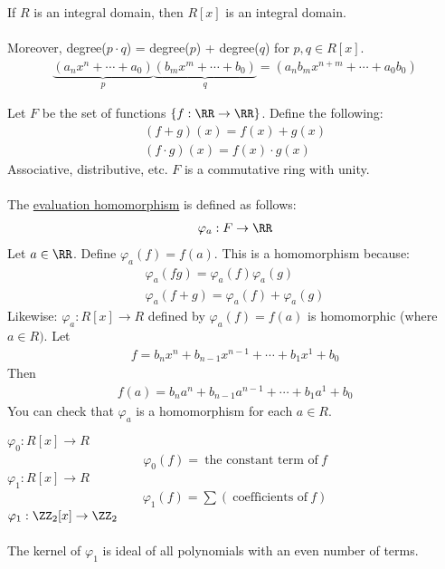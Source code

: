 \documentclass[class=scrartcl, crop=false]{standalone}
\begin{document}
\begin{proposition}
  If $R$ is an integral domain, then $R[x]$ is an integral domain.
  \\\\
  Moreover, degree($p \cdot q$) = degree($p$) + degree($q$) for $p, q \in R[x]$.
  \begin{gather*}
    \underbrace{(a_nx^n + \cdots + a_0)}_{p}\underbrace{(b_mx^m + \cdots + b_0)}_{q} = (a_nb_mx^{n + m} + \cdots + a_0b_0)
  \end{gather*} 
\end{proposition} 

\begin{definition}
  Let $F$ be the set of functions $\{f: \RR \to \RR\}$. Define the following:
  \begin{gather*}
    (f + g)(x) = f(x) + g(x) \\
    (f \cdot g)(x) = f(x) \cdot g(x)
  \end{gather*} 
  Associative, distributive, etc. $F$ is a commutative ring with unity.
  \\\\
  The \ul{evaluation homomorphism} is defined as follows:
  \begin{gather*}
    \varphi_{a}: F \to \RR
  \end{gather*} 
  Let $a \in \RR$. Define $\varphi_{a}(f) = f(a)$. This is a homomorphism because:
  \begin{gather*}
    \varphi_a(fg) = \varphi_a(f)\varphi_a(g) \\
    \varphi_a(f + g) = \varphi_a(f) + \varphi_a(g)
  \end{gather*} 
  Likewise: $\varphi_a:R[x] \to R$ defined by $\varphi_a(f) = f(a)$ is homomorphic (where $a \in R)$. Let 
  \begin{gather*}
    f = b_n x^n + b_{n- 1}x^{n - 1} + \cdots + b_1x^1 + b_0
  \end{gather*} 
  Then 
  \begin{gather*}
    f(a) = b_n a^n + b_{n- 1}a^{n - 1} + \cdots + b_1a^1 + b_0
  \end{gather*} 
  You can check that $\varphi_a$ is a homomorphism for each $a \in R$.
  \begin{example}
    \begin{enumerate}
      \ii[]
      \ii
      $\varphi_0: R[x] \to R$
      \begin{gather*}
        \varphi_0(f) = \ \text{the constant term of} \ f
      \end{gather*} 
      \ii
      $\varphi_1:R[x] \to R$
      \begin{gather*}
        \varphi_1(f) = \sum ( \ \text{coefficients of} \ f)
      \end{gather*} 
      \ii
      $\varphi_1: \ZZ_2[x] \to \ZZ_2$ 
      \\\\
      The kernel of $\varphi_1$ is ideal of all polynomials with an even number of terms.
    \end{enumerate} 
  \end{example} 

\end{definition} 
\end{document}
